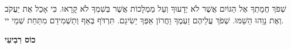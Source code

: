 
שְׁפֹךְ חֲמָתְךָ אֶל הַגּוֹיִם אֲשֶׁר לֹא יְדָעוּךָ וְעַל מַמְלָכוֹת אֲשֶׁר בְּשִׁמְךָ לֹא קָרָאוּ. כִּי אָכַל אֶת יַעֲקֹב וְאֶת נָוֵהוּ הֵשַׁמּוּ. שְׁפֹךְ עֲלֵיהֶם זַעְמֶךָ וַחֲרוֹן אַפְּךָ יַשִׂיגֵם. תִּרְדֹּף בְּאַף וְתַשְׁמִידֵם מִתַּחַת שְׁמֵי יי.


\begin{center}
{\large \bfseries \textcolor{light-gray}{
כוֹס רִבִיעִי
}}
\end{center}


\vspace{1em}

